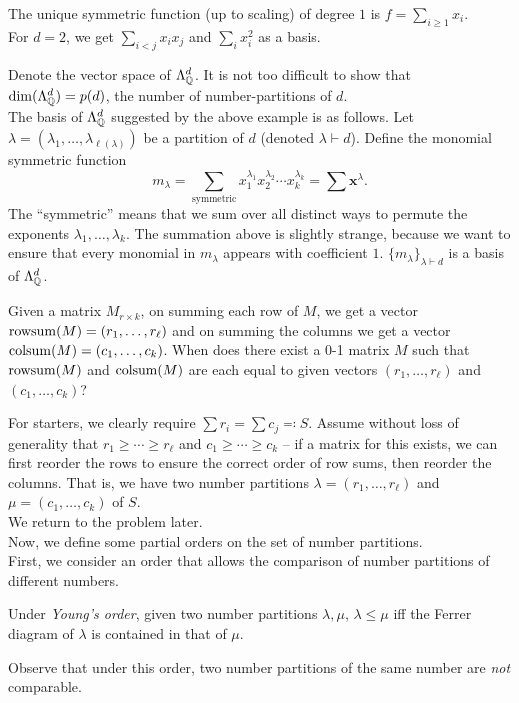 	\begin{fex}
		The unique symmetric function (up to scaling) of degree $1$ is $f = \sum_{i \ge 1} x_i$.\\
		For $d=2$, we get $\sum_{i<j} x_ix_j$ and $\sum_i x_i^2$ as a basis.
	\end{fex}

	Denote the vector space of $\Lambda_{\mathbb{Q}}^d$. It is not too difficult to show that $\dim(\Lambda_{\mathbb{Q}}^d) = p(d)$, the number of number-partitions of $d$.\\
	The basis of $\Lambda_{\mathbb{Q}}^d$ suggested by the above example is as follows. Let $\lambda = (\lambda_1,\ldots,\lambda_{\ell(\lambda)})$ be a partition of $d$ (denoted $\lambda \vdash d$). Define the monomial symmetric function
	\[ m_\lambda = \sum_{\text{symmetric}} x_1^{\lambda_1} x_2^{\lambda_2} \cdots x_k^{\lambda_k} = \sum \textbf{x}^\lambda. \]
	The ``symmetric'' means that we sum over all distinct ways to permute the exponents $\lambda_1,\ldots,\lambda_k$. The summation above is slightly strange, because we want to ensure that every monomial in $m_\lambda$ appears with coefficient $1$. $\{m_\lambda\}_{\lambda \vdash d}$ is a basis of $\Lambda_{\mathbb{Q}}^d$.

	\begin{question*}
		\label{question: rowsum colsum}
		Given a matrix $M_{r \times k}$, on summing each row of $M$, we get a vector $\operatorname{rowsum}(M) = (r_1,\ldots,r_\ell)$ and on summing the columns we get a vector $\operatorname{colsum}(M) = (c_1,\ldots,c_k)$. When does there exist a 0-1 matrix $M$ such that $\operatorname{rowsum}(M)$ and $\operatorname{colsum}(M)$ are each equal to given vectors $(r_1,\ldots,r_\ell)$ and $(c_1,\ldots,c_k)$?
	\end{question*}

	For starters, we clearly require $\sum r_i = \sum c_j \eqqcolon S$. Assume without loss of generality that $r_1 \ge \cdots \ge r_\ell$ and $c_1 \ge \cdots \ge c_k$ -- if a matrix for this exists, we can first reorder the rows to ensure the correct order of row sums, then reorder the columns. That is, we have two number partitions $\lambda = (r_1,\ldots,r_\ell)$ and $\mu = (c_1,\ldots,c_k)$ of $S$.\\
	We return to the problem later.\\


	Now, we define some partial orders on the set of number partitions.\\
	First, we consider an order that allows the comparison of number partitions of different numbers.
	\begin{fdef}
		Under \emph{Young's order}, given two number partitions $\lambda,\mu$, $\lambda \le \mu$ iff the Ferrer diagram of $\lambda$ is contained in that of $\mu$.
	\end{fdef}
	Observe that under this order, two number partitions of the same number are \emph{not} comparable.\\

